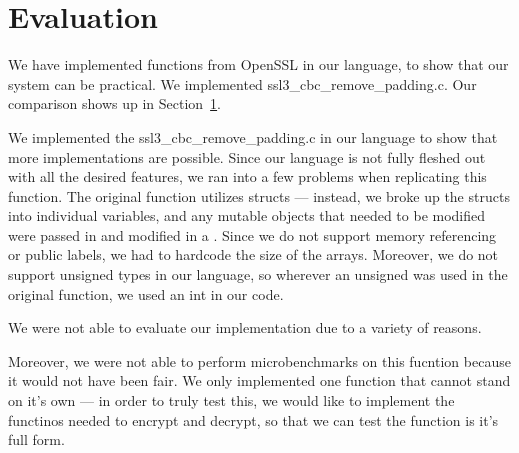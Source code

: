\section{Evaluation}
\label{sec:evaluation}

We have implemented functions from OpenSSL in our language, to show that our
system can be practical. We implemented ssl3\_cbc\_remove\_padding.c. Our
comparison shows up in Section~\ref{sec:evaluation}.

 We implemented the ssl3\_cbc\_remove\_padding.c in our language to show that more implementations are possible. Since our language is not fully fleshed out with all the desired features, we ran into a few problems when replicating this function. The original function utilizes structs --- instead, we broke up the structs into individual variables, and any mutable objects that needed to be modified were passed in and modified in a \bytearray. Since we do not support memory referencing or public labels, we had to hardcode the size of the arrays. Moreover, we do not support unsigned types in our language, so wherever an unsigned was used in the original function, we used an int in our code.

We were not able to evaluate our implementation due to a variety of reasons.

\cite{almeida2016}

Moreover, we were not able to perform microbenchmarks on this fucntion because
it would not have been fair. We only implemented one function that cannot stand
on it's own --- in order to truly test this, we would like to implement the
functinos needed to encrypt and decrypt, so that we can test the function is
it's full form.

